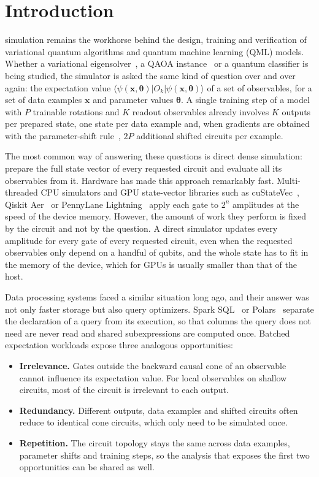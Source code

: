 \section{Introduction}
\label{sec:intro}
 simulation remains the workhorse behind the design, training and verification of variational quantum algorithms and quantum machine learning (QML) models. Whether a variational eigensolver~\cite{peruzzo2014variational}, a QAOA instance~\cite{farhi2014quantum} or a quantum classifier is being studied, the simulator is asked the same kind of question over and over again: the expectation value $\langle\psi(\mathbf{x},\boldsymbol\theta)|O_k|\psi(\mathbf{x},\boldsymbol\theta)\rangle$ of a set of observables, for a set of data examples $\mathbf{x}$ and parameter values $\boldsymbol\theta$. A single training step of a model with $P$ trainable rotations and $K$ readout observables already involves $K$ outputs per prepared state, one state per data example and, when gradients are obtained with the parameter-shift rule~\cite{schuld2019gradients}, $2P$ additional shifted circuits per example.

The most common way of answering these questions is direct dense simulation: prepare the full state vector of every requested circuit and evaluate all its observables from it. Hardware has made this approach remarkably fast. Multi-threaded CPU simulators and GPU state-vector libraries such as cuStateVec~\cite{bayraktar2023cuquantum}, Qiskit Aer~\cite{javadi2024qiskit} or PennyLane Lightning~\cite{asadi2024lightning} apply each gate to $2^n$ amplitudes at the speed of the device memory. However, the amount of work they perform is fixed by the circuit and not by the question. A direct simulator updates every amplitude for every gate of every requested circuit, even when the requested observables only depend on a handful of qubits, and the whole state has to fit in the memory of the device, which for GPUs is usually smaller than that of the host.

Data processing systems faced a similar situation long ago, and their answer was not only faster storage but also query optimizers. Spark SQL~\cite{armbrust2015sparksql} or Polars~\cite{polarsoptimizations} separate the declaration of a query from its execution, so that columns the query does not need are never read and shared subexpressions are computed once. Batched expectation workloads expose three analogous opportunities:
\begin{itemize}
\item \textbf{Irrelevance.} Gates outside the backward causal cone of an observable cannot influence its expectation value. For local observables on shallow circuits, most of the circuit is irrelevant to each output.
\item \textbf{Redundancy.} Different outputs, data examples and shifted circuits often reduce to identical cone circuits, which only need to be simulated once.
\item \textbf{Repetition.} The circuit topology stays the same across data examples, parameter shifts and training steps, so the analysis that exposes the first two opportunities can be shared as well.
\end{itemize}


